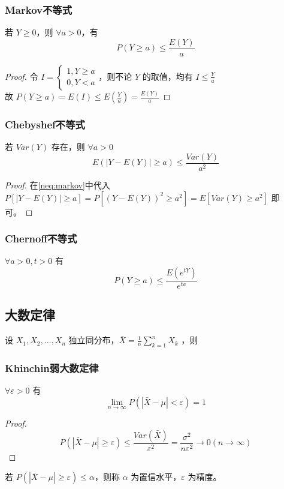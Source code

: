 \documentclass[./main.tex]{subfiles}
\begin{document}
\subsubsection{Markov不等式}
若 $Y\ge 0$，则 $\forall a>0$，有
\begin{equation}\label{neq:markov}
    P(Y\ge a)\le \frac{E(Y)}{a}
\end{equation}
\begin{proof}令 $I=\begin{cases}
    1, Y\ge a\\0,Y<a
\end{cases}$，则不论 $Y$ 的取值，均有 $I\le \frac{Y}{a}$\\故 $P(Y\ge a)=E(I)\le E(\frac{Y}{a})=\frac{E(Y)}{a}$
\end{proof}
\subsubsection{Chebyshef不等式}
若 $Var(Y)$ 存在，则 $\forall a>0$
\begin{equation}
    E(|Y-E(Y)|\ge a)\le \frac{Var(Y)}{a^2}
\end{equation}
\begin{proof}
    在\eqref{neq:markov}中代入 $P[|Y-E(Y)|\ge a]=P[(Y-E(Y))^2\ge a^2]=E[Var(Y)\ge a^2]$ 即可。
\end{proof}
\subsubsection{Chernoff不等式}
$\forall a>0,t>0$ 有 
\begin{equation}
    P(Y\ge a)\le \frac{E(e^{tY})}{e^{ta}}
\end{equation}
\subsection{大数定律}
设 $X_1,X_2,\dots,X_n$ 独立同分布，$\bar{X}=\frac{1}{n}\sum_{k=1}^nX_k$ ，则\\
\subsubsection{Khinchin弱大数定律}$\forall \varepsilon>0$ 有
\begin{equation}
    \lim\limits_{n\rightarrow\infty}P(|\bar{X}-\mu|<\varepsilon)=1
\end{equation}
\begin{proof}
    $$P(|\bar{X}-\mu|\ge\varepsilon)\le\frac{Var(\bar{X})}{\varepsilon^2}=\frac{\sigma^2}{n\varepsilon^2}\rightarrow 0(n\rightarrow\infty)$$
\end{proof}
若 $P(|\bar{X}-\mu|\ge\varepsilon)\le\alpha$，则称 $\alpha$ 为置信水平，$\varepsilon$ 为精度。
\end{document}

